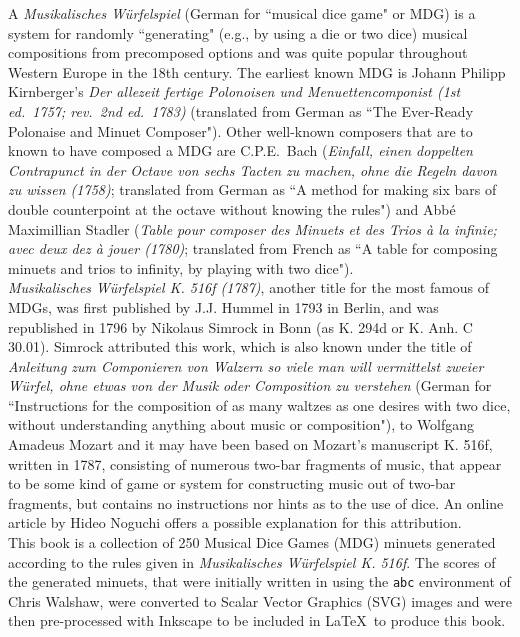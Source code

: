 \documentclass[letterpaper,x11names,svgnames,10pt]{article}
\begin{document}
A {\it Musikalisches W\"{u}rfelspiel} (German for ``musical dice game" or MDG) is a system for randomly ``generating" (e.g., by using a die or two dice) musical compositions from precomposed options and was quite popular throughout Western Europe in the 18th century.  The earliest known MDG is Johann Philipp Kirnberger's {\em Der allezeit fertige Polonoisen und Menuettencomponist (1st ed.\ 1757; rev.\ 2nd ed.\ 1783)} (translated from German as ``The Ever-Ready Polonaise and Minuet Composer").  Other well-known composers that are to known to have composed a MDG are C.P.E.\ Bach ({\em Einfall, einen doppelten Contrapunct in der Octave von sechs Tacten zu machen, ohne die Regeln davon zu wissen (1758)}; translated from German as ``A method for making six bars of double counterpoint at the octave without knowing the rules") and Abb\'{e} Maximillian Stadler ({\em Table pour composer des Minuets et des Trios \`{a} la infinie; avec deux dez \`{a} jouer (1780)}; translated from French as ``A table for composing minuets and trios to infinity, by playing with two dice"). \\

{\it Musikalisches W\"{u}rfelspiel K. 516f (1787)}, another title for the most famous of MDGs, was first published by J.J. Hummel in 1793 in Berlin, and was republished in 1796 by Nikolaus Simrock in Bonn (as K. 294d or K. Anh. C 30.01).  Simrock attributed this work, which is also known under the title of {\em Anleitung zum Componieren von Walzern so viele man will vermittelst zweier W\"{u}rfel, ohne etwas von der Musik oder Composition zu verstehen} (German for ``Instructions for the composition of as many waltzes as one desires with two dice, without understanding anything about music or composition"), to Wolfgang Amadeus Mozart and it may have been based on Mozart's manuscript K. 516f, written in 1787, consisting of numerous two-bar fragments of music, that appear to be some kind of game or system for constructing music out of two-bar fragments, but contains no instructions nor hints as to the use of dice.  An online article by Hideo Noguchi offers a possible explanation for this attribution. \\

This book is a collection of 250 Musical Dice Games (MDG) minuets generated according to the rules given in {\it Musikalisches W\"{u}rfelspiel K. 516f}.  The scores of the generated minuets, that were initially written in using the \texttt{abc} environment of Chris Walshaw, were converted to Scalar Vector Graphics (SVG) images and were then pre-processed with Inkscape to be included in \LaTeX\ to produce this book.
\end{document}
